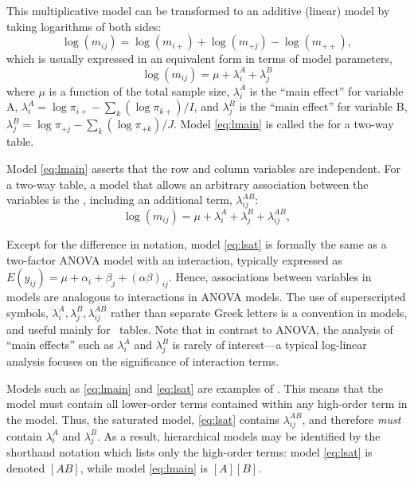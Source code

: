 \documentclass[10pt,krantz2]{krantz}\usepackage[]{graphicx}\usepackage[]{color}
\begin{document}
This multiplicative model can be transformed to an additive (linear)
model by taking logarithms of both sides:
\begin{equation*}
  \log ( m_{ij} ) = \log ( m_{i+} )  +  \log ( m_{+j} )
 - \log ( m_{++} )
 \comma
\end{equation*}
which is usually expressed in an equivalent form in terms of model
parameters,
\begin{equation} \label{eq:lmain}
\log ( m_{ij} ) = \mu  +  \lambda_i^A +  \lambda_j^B
\end{equation}
where \(\mu\) is a function of the total sample size, \(\lambda_i^A\)
is the ``main effect'' for variable A,
\(\lambda_i^A = \log \pi_{i+} - \sum_k(\log \pi_{k+}) / I \),
 and \(\lambda_j^B\) is the
``main effect'' for variable B,
\(\lambda_j^B = \log \pi_{+j} - \sum_k(\log \pi_{+k}) / J \).
Model \eqref{eq:lmain} is called the 
for a two-way table.

Model \eqref{eq:lmain} asserts that the row and column variables
are independent.
For a two-way table, a model that allows an arbitrary
association between the variables is the ,
including an additional term, $\lambda_{ij}^{AB}$:
\begin{equation}\label{eq:lsat}
\log ( m_{ij} ) = \mu  +  \lambda_i^A
+  \lambda_j^B  +  \lambda_{ij}^{AB} \comma
\end{equation}

Except for the difference in notation, model \eqref{eq:lsat} is formally the same
as a two-factor ANOVA model with an interaction, typically expressed as
$  E ( y_{ij} ) = \mu  +  \alpha_i  +  \beta_j +(\alpha  \beta)_{ij}
$.
Hence, associations between variables in \loglin models are
analogous to interactions in ANOVA models. 
The use of superscripted symbols,
$\lambda_i^A, \lambda_j^B , \lambda_{ij}^{AB}$ rather than separate
Greek letters is a convention in \loglin models, and useful mainly
for \mway\ tables. Note that in contrast to ANOVA, the analysis of
``main effects'' such as $\lambda_i^A$ and $\lambda_j^B$ is rarely 
of interest---a typical log-linear analysis focuses on the significance of
interaction terms.

Models such as \eqref{eq:lmain} and \eqref{eq:lsat} are
examples of .
This means that the model must contain all lower-order terms contained
within any high-order term in the model.
Thus, the saturated model, \eqref{eq:lsat} contains $\lambda_{ij}^{AB}$,
and therefore \emph{must} contain $\lambda_i^A $ and $\lambda_j^B$.
As a result, hierarchical models may be identified by the shorthand
notation which lists only the high-order terms: model \eqref{eq:lsat}
is denoted $[A B]$, while model \eqref{eq:lmain} is $[A] [B]$.
\end{document}
